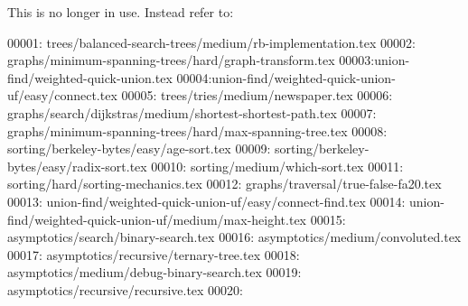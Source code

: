This is no longer in use. Instead refer to:

00001: trees/balanced-search-trees/medium/rb-implementation.tex
00002: graphs/minimum-spanning-trees/hard/graph-transform.tex
00003:union-find/weighted-quick-union.tex
00004:union-find/weighted-quick-union-uf/easy/connect.tex
00005: trees/tries/medium/newspaper.tex
00006: graphs/search/dijkstras/medium/shortest-shortest-path.tex
00007: graphs/minimum-spanning-trees/hard/max-spanning-tree.tex
00008: sorting/berkeley-bytes/easy/age-sort.tex
00009: sorting/berkeley-bytes/easy/radix-sort.tex
00010: sorting/medium/which-sort.tex
00011: sorting/hard/sorting-mechanics.tex
00012: graphs/traversal/true-false-fa20.tex
00013: union-find/weighted-quick-union-uf/easy/connect-find.tex
00014: union-find/weighted-quick-union-uf/medium/max-height.tex
00015: asymptotics/search/binary-search.tex
00016: asymptotics/medium/convoluted.tex
00017: asymptotics/recursive/ternary-tree.tex
00018: asymptotics/medium/debug-binary-search.tex
00019: asymptotics/recursive/recursive.tex
00020: 